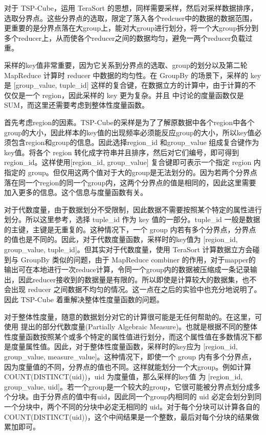 对于 TSP-Cube，运用 TeraSort 的思想，同样需要采样，然后对采样数据排序，选取分界点。这些分界点的选取，限定了落入各个redcuer中的数据的数据范围，更重要的是分界点落在大group上，能对大group进行划分，将一个大group拆分到多个reducer上，从而使各个reducer之间的数据均匀，避免一两个reducer负载过重。

采样的key值非常重要，因为它关系到分界点的选取、group的划分以及第二轮 MapReduce 计算时 reducer 中数据的均匀性。在 GroupBy 的场景下，采样的 key 是 [group\_value, tuple\_id] 这样的复合键，在数据立方的计算中，由于计算的不仅仅是一个 region，因此采样的 key 更为复杂。并且\cite{tao2013minimal} 中讨论的度量函数仅是 SUM，而这里还需要考虑到整体性度量函数。

首先考虑region的因素。TSP-Cube的采样是为了了解原数据中各个region中各个group的大小，因此样本的key值的出现频率必须能反应group的大小，所以key值必须包含region和group的信息。因此选择region\_id 和group\_value 组成复合键作为key值。将各个 region 转化成字符串并且排序，然后对它们编号，即可得到 region\_id。这样使用[region\_id, group\_value] 复合键即可表示一个指定 region 内指定的 group。但仅用这两个值对于大的group是无法划分的。因为若两个分界点落在同一个region的同一个group内，这两个分界点的值是相同的，因此这里需要加入更多的信息。这个信息与度量函数有关。

对于代数度量，由于数据划分不受限制，因此数据不需要按照某个特定的属性进行划分。所以这里参考\cite{tao2013minimal}，选择 tuple\_id 作为 key 值的一部分。tuple\_id 一般是数据的主键，主键是无重复的。这种情况下，一个 group 内若有多个分界点，分界点的值也是不同的。因此，对于代数度量函数，采样时的key值为 [region\_id, group\_value, tuple\_id]。但其实对于代数度量，使用 TeraSort 计算数据立方会碰到与 GroupBy 类似的问题，由于 MapReduce combiner 的作用，对于mapper的输出可在本地进行一次reduce计算，令同一个group内的数据被压缩成一条记录输出，因此reducer接收到的数据量是有限的。所以即使是计算较大的数据集，也不会出现 reducer 之间数据不均匀的情况。这一点在之后的实验中也充分地说明了。因此 TSP-Cube 着重解决整体性度量函数的问题。

对于整体性度量，随意的数据划分对它的计算很可能是无任何帮助的。在这里，可使用 \cite{nandi2011distributed} 提出的部分代数度量(Partially Algebraic Measure)。也就是根据不同的整体性度量函数按照某个或多个特定的属性值进行划分，而这个属性值在多数情况下都是度量属性值。因此，对于整体性度量函数，采样时的key应为 [region\_id, group\_value, measure\_value]。这种情况下，即使一个 group 内有多个分界点，因为度量值的不同，分界点的值也不同。这样就能划分一个大group。例如计算 COUNT(DISTINCT(uid))，uid 为度量值，那么采样的key值	为 [region\_id, group\_value, uid]。若一个group是一个较大的group，它很可能被分界点划分成多个分块。由于分界点的值中有uid，因此同一个group内相同的 uid 必定会划分到同一个分块中，两个不同的分块中必定无相同的 uid。对于每个分块可以计算各自的 COUNT(DISTINCT(uid))，这个中间结果是一个整数，最后对每个分块的结果做累加即可。

